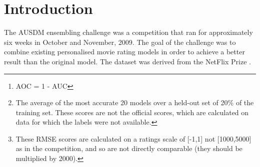 \documentclass{article}
\begin{document}
 


\begin{abstract} 

We describe how we combined 1151 ``black box'' models into a more powerful ensemble predictor.  Several models that achieved significant success on the AUC task were produced: a deep neural network model, a gated classifier and a multiple logistic regression model.  Further improvement was achieved by adding features derived from the model input, and by adding unsupervised features from decomposing the model inputs (using a SVD or denoising auto-encoders).

On the large AUC task, the baseline AOC\footnote{AOC = 1 - AUC} performance\footnote{The average of the most accurate 20 models over a held-out set of 20\% of the training set.  These scores are not the official scores, which are calculated on data for which the labels were not available.} of 0.1635 was improved to 0.1461.  On the more difficult medium task, the baseline performance of 0.3384 was improved to 0.3144.  On the simpler small task, the baseline of 0.0597 was improved to 0.0571.

Less attention was given to the RMSE task, and very little improvement was possible.  The best result, on the large task, reduced the baseline of 0.4419 to 0.4385\footnote{These RMSE scores are calculated on a ratings scale of [-1,1] not [1000,5000] as in the competition, and so are not directly comparable (they should be multiplied by 2000).}.

The ``black box'' nature of the competition and the underlying noise in the labels (to which the RMSE score is particularly sensitive) make progress difficult.  An alternative framework for ensembling is discussed which, whilst placing more requirements on model builders, would likely lead to better improvement in the ensembles.

\end{abstract}

\section{Introduction}

The AUSDM ensembling challenge was a competition that ran for approximately six weeks in October and November, 2009.  The goal of the challenge was to combine existing personalised movie rating models in order to achieve a better result than the original model.  The dataset was derived from the NetFlix Prize \cite{NetFlixPrize}.
\end{document}
